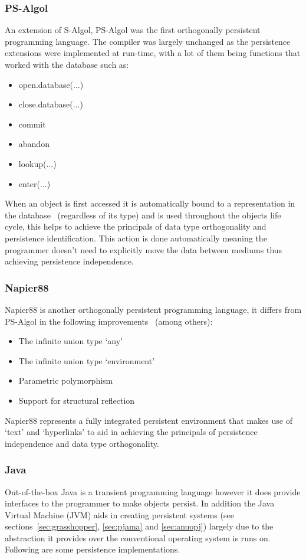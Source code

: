 \documentclass[a4paper,12pt]{article}
\begin{document}
\subsubsection{PS-Algol}
An extension of S-Algol, PS-Algol was the first orthogonally persistent programming language. The compiler was largely unchanged as the persistence extensions were implemented at run-time, with a lot of them being functions that worked with the database such as:
\begin{itemize}
    \item{open.database(...)}
    \item{close.database(...)}
    \item{commit}
    \item{abandon}
    \item{lookup(...)}
    \item{enter(...)}
\end{itemize}
When an object is first accessed it is automatically bound to a representation in the database~\citep{psalgol} (regardless of its type) and is used throughout the objects life cycle, this helps to achieve the principals of data type orthogonality and persistence identification. This action is done automatically meaning the programmer doesn't need to explicitly move the data between mediums thus achieving persistence independence.
\subsubsection{Napier88}
Napier88 is another orthogonally persistent programming language\citep{napier}, it differs from PS-Algol in the following improvements~\citep{ADearle} (among others):
\begin{itemize}
    \item{The infinite union type `any'}
    \item{The infinite union type `environment'} 
    \item{Parametric polymorphism}
    \item{Support for structural reflection}
\end{itemize}
Napier88 represents a fully integrated persistent environment that makes use of `text' and `hyperlinks' to aid in achieving the principals of persistence independence and data type orthogonality.
\subsubsection{Java}
Out-of-the-box Java is a transient programming language however it does provide interfaces to the programmer to make objects persist. In addition the Java Virtual Machine (JVM) aids in creating persistent systems (see sections~\ref{sec:grasshopper}, \ref{sec:pjama} and \ref{sec:anuopj}) largely due to the abstraction it provides over the conventional operating system is runs on. Following are some persistence implementations.
\end{document}
